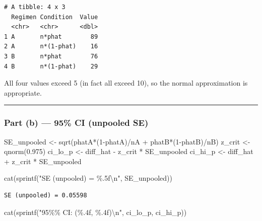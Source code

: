 \documentclass[
  letterpaper,
  DIV=11,
  numbers=noendperiod]{scrartcl}
\newenvironment{Shaded}{\begin{snugshade}}{\end{snugshade}}
\newcommand{\DecValTok}[1]{\textcolor[rgb]{0.68,0.00,0.00}{#1}}
\newcommand{\FloatTok}[1]{\textcolor[rgb]{0.68,0.00,0.00}{#1}}
\newcommand{\FunctionTok}[1]{\textcolor[rgb]{0.28,0.35,0.67}{#1}}
\newcommand{\NormalTok}[1]{\textcolor[rgb]{0.00,0.23,0.31}{#1}}
\newcommand{\OtherTok}[1]{\textcolor[rgb]{0.00,0.23,0.31}{#1}}
\newcommand{\SpecialCharTok}[1]{\textcolor[rgb]{0.37,0.37,0.37}{#1}}
\newcommand{\StringTok}[1]{\textcolor[rgb]{0.13,0.47,0.30}{#1}}
\begin{document}
\begin{verbatim}
# A tibble: 4 x 3
  Regimen Condition  Value
  <chr>   <chr>      <dbl>
1 A       n*phat        89
2 A       n*(1-phat)    16
3 B       n*phat        76
4 B       n*(1-phat)    29
\end{verbatim}

All four values exceed 5 (in fact all exceed 10), so the normal
approximation is appropriate.

\begin{center}\rule{0.5\linewidth}{0.5pt}\end{center}

\subsubsection{Part (b) --- 95\% CI (unpooled
SE)}\label{part-b-95-ci-unpooled-se}

\begin{Shaded}
\begin{Highlighting}[]
\NormalTok{SE\_unpooled }\OtherTok{\textless{}{-}} \FunctionTok{sqrt}\NormalTok{(phatA}\SpecialCharTok{*}\NormalTok{(}\DecValTok{1}\SpecialCharTok{{-}}\NormalTok{phatA)}\SpecialCharTok{/}\NormalTok{nA }\SpecialCharTok{+}\NormalTok{ phatB}\SpecialCharTok{*}\NormalTok{(}\DecValTok{1}\SpecialCharTok{{-}}\NormalTok{phatB)}\SpecialCharTok{/}\NormalTok{nB)}
\NormalTok{z\_crit      }\OtherTok{\textless{}{-}} \FunctionTok{qnorm}\NormalTok{(}\FloatTok{0.975}\NormalTok{)}
\NormalTok{ci\_lo\_p     }\OtherTok{\textless{}{-}}\NormalTok{ diff\_hat }\SpecialCharTok{{-}}\NormalTok{ z\_crit }\SpecialCharTok{*}\NormalTok{ SE\_unpooled}
\NormalTok{ci\_hi\_p     }\OtherTok{\textless{}{-}}\NormalTok{ diff\_hat }\SpecialCharTok{+}\NormalTok{ z\_crit }\SpecialCharTok{*}\NormalTok{ SE\_unpooled}

\FunctionTok{cat}\NormalTok{(}\FunctionTok{sprintf}\NormalTok{(}\StringTok{"SE (unpooled) = \%.5f}\SpecialCharTok{\textbackslash{}n}\StringTok{"}\NormalTok{, SE\_unpooled))}
\end{Highlighting}
\end{Shaded}

\begin{verbatim}
SE (unpooled) = 0.05598
\end{verbatim}

\begin{Shaded}
\begin{Highlighting}[]
\FunctionTok{cat}\NormalTok{(}\FunctionTok{sprintf}\NormalTok{(}\StringTok{"95\%\% CI: (\%.4f, \%.4f)}\SpecialCharTok{\textbackslash{}n}\StringTok{"}\NormalTok{, ci\_lo\_p, ci\_hi\_p))}
\end{Highlighting}
\end{Shaded}
\end{document}
